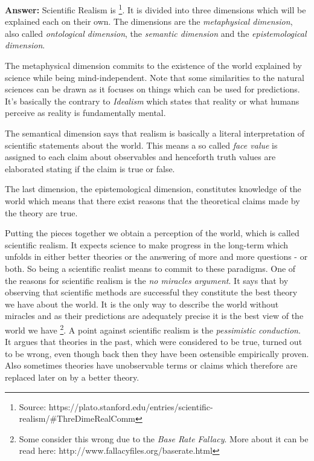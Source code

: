 \documentclass[11pt]{scrartcl}
\begin{document}
\bigbreak

\textbf{Answer:} Scientific Realism is  \footnote{Source: https://plato.stanford.edu/entries/scientific-realism/\#ThreDimeRealComm}. It is divided into three dimensions which will be explained each on their own. The dimensions are the \textit{metaphysical dimension}, also called \textit{ontological dimension}, the \textit{semantic dimension} and the \textit{epistemological dimension}.

The metaphysical dimension commits to the existence of the world explained by science while being mind-independent. Note that some similarities to the natural sciences can be drawn as it focuses on things which can be used for predictions. It's basically the contrary to \textit{Idealism} which states that reality or what humans perceive as reality is fundamentally mental.

The semantical dimension says that realism is basically a literal interpretation of scientific statements about the world. This means a so called \textit{face value} is assigned to each claim about observables and henceforth truth values are elaborated stating if the claim is true or false.

The last dimension, the epistemological dimension, constitutes knowledge of the world which means that there exist reasons that the theoretical claims made by the theory are true.

Putting the pieces together we obtain a perception of the world, which is called scientific realism. It expects science to make progress in the long-term which unfolds in either better theories or the answering of more and more questions - or both. So being a scientific realist means to commit to these paradigms. One of the reasons for scientific realism is the \textit{no miracles argument}. It says that by observing that scientific methods are successful they constitute the best theory we have about the world. It is the only way to describe the world without miracles and as their predictions are adequately precise it is the best view of the world we have \footnote{Some consider this wrong due to the \textit{Base Rate Fallacy}. More about it can be read here: http://www.fallacyfiles.org/baserate.html}. A point against scientific realism is the \textit{pessimistic conduction}. It argues that theories in the past, which were considered to be true, turned out to be wrong, even though back then they have been ostensible empirically proven. Also sometimes theories have unobservable terms or claims which therefore are replaced later on by a better theory.
\end{document}
